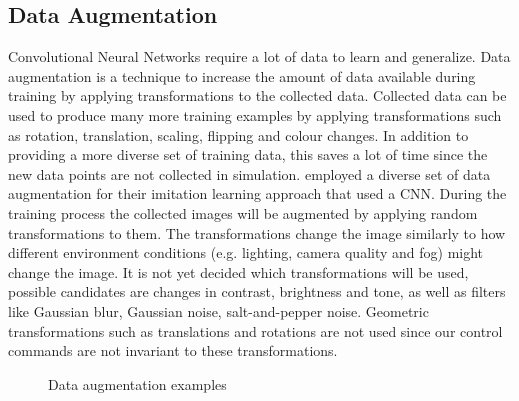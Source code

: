 


\subsection*{Data Augmentation}
Convolutional Neural Networks require a lot of data to learn and generalize. Data augmentation is a technique to increase the amount of data available during training by applying transformations to the collected data. Collected data can be used to produce many more training examples by applying transformations such as rotation, translation, scaling, flipping and colour changes. In addition to providing a more diverse set of training data, this saves a lot of time since the new data points are not collected in simulation. \autocite{conditional_imitation_learning} employed a diverse set of data augmentation for their imitation learning approach that used a CNN.
During the training process the collected images will be augmented by applying random transformations to them. The transformations change the image similarly to how different environment conditions (e.g. lighting, camera quality and fog) might change the image. It is not yet decided which transformations will be used, possible candidates are changes in contrast, brightness and tone, as well as filters like Gaussian blur, Gaussian noise, salt-and-pepper noise.
Geometric transformations such as translations and rotations are not used since our control commands are not invariant to these transformations.


\begin{figure}
     \centering
     \caption{Data augmentation examples}
     \label{fig:data_augmentation}
\end{figure}

